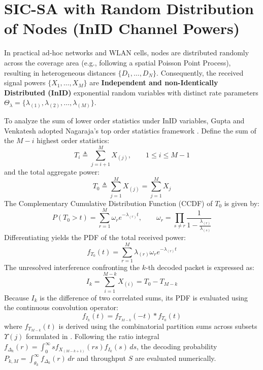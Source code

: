 \section{SIC-SA with Random Distribution of Nodes (InID Channel Powers)}
In practical ad-hoc networks and WLAN cells, nodes are distributed randomly across the coverage area (e.g., following a spatial Poisson Point Process), resulting in heterogeneous distances $\{D_1, \dots, D_N\}$. Consequently, the received signal powers $\{X_1, \dots, X_M\}$ are \textbf{Independent and non-Identically Distributed (InID)} exponential random variables with distinct rate parameters $\Theta_\lambda = \{\lambda_{(1)}, \lambda_{(2)}, \dots, \lambda_{(M)}\}$.

To analyze the sum of lower order statistics under InID variables, Gupta and Venkatesh adopted Nagaraja's top order statistics framework \cite{gupta2022sic}. Define the sum of the $M - i$ highest order statistics:
\begin{equation}
    T_i \triangleq \sum_{j=i+1}^M X_{(j)}, \qquad 1 \le i \le M - 1
\end{equation}
and the total aggregate power:
\begin{equation}
    T_0 \triangleq \sum_{j=1}^M X_{(j)} = \sum_{j=1}^M X_j
\end{equation}
The Complementary Cumulative Distribution Function (CCDF) of $T_0$ is given by:
\begin{equation}
    P(T_0 > t) = \sum_{r=1}^M \omega_r e^{-\lambda_{(r)} t}, \qquad \omega_r = \prod_{s \ne r} \frac{1}{1 - \frac{\lambda_{(r)}}{\lambda_{(s)}}}
\end{equation}
Differentiating yields the PDF of the total received power:
\begin{equation}
    f_{T_0}(t) = \sum_{r=1}^M \lambda_{(r)} \omega_r e^{-\lambda_{(r)} t}
\end{equation}
The unresolved interference confronting the $k$-th decoded packet is expressed as:
\begin{equation}
    I_k = \sum_{i=1}^{M-k} X_{(i)} = T_0 - T_{M-k}
\end{equation}
Because $I_k$ is the difference of two correlated sums, its PDF is evaluated using the continuous convolution operator:
\begin{equation}
    f_{I_k}(t) = f_{T_{M-k}}(-t) \ast f_{T_0}(t)
\end{equation}
where $f_{T_{M-k}}(t)$ is derived using the combinatorial partition sums across subsets $\Upsilon(j)$ formulated in \cite{gupta2022sic}. Following the ratio integral $f_{\Delta_k}(r) = \int_0^\infty s f_{X_{(M-k+1)}}(r s) f_{I_k}(s) \, ds$, the decoding probability $P_{k,M} = \int_{\theta_k}^\infty f_{\Delta_k}(r) \, dr$ and throughput $S$ are evaluated numerically.

